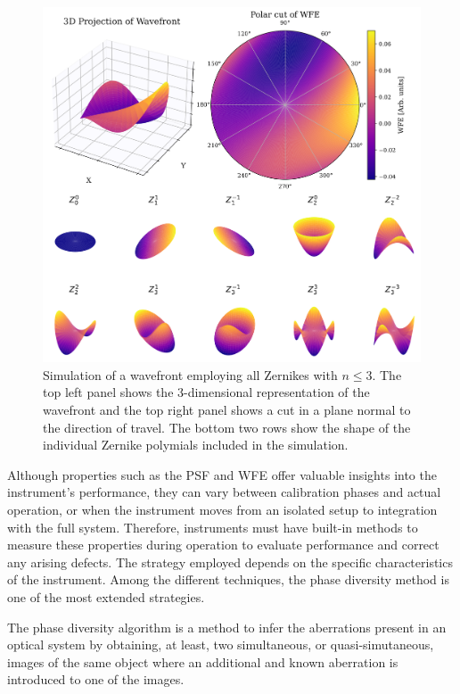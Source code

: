 \begin{figure}
  \centering
  \includegraphics[width = \textwidth]{figures/Introduction/zernikes_combined.pdf}
  \caption[Zernike representation of wavefront error.]{Simulation of a wavefront employing all Zernikes with $n \leqslant 3$. The top left panel shows the 3-dimensional representation of the wavefront and the top right panel shows a cut in a plane normal to the direction of travel. The bottom two rows show the shape of the individual Zernike polymials included in the simulation.} 
  \label{fig_intro: zernikes}
\end{figure}

Although properties such as the PSF and WFE offer valuable insights into the instrument's performance, they can vary between calibration phases and actual operation, or when the instrument moves from an isolated setup to integration with the full system. Therefore, instruments must have built-in methods to measure these properties during operation to evaluate performance and correct any arising defects. The strategy employed depends on the specific characteristics of the instrument. Among the different techniques, the phase diversity method is one of the most extended strategies. 

The phase diversity algorithm \citep{PD_original} is a method to infer the aberrations present in an optical system by obtaining, at least, two simultaneous, or quasi-simutaneous, images of the same object where an additional and known aberration is introduced to one of the images.  

